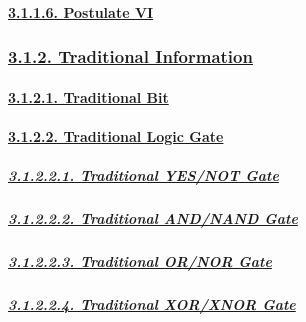 \documentclass[
]{article}
\begin{document}
\hypertarget{postulate-vi}{%
\paragraph{\texorpdfstring{\protect\hyperlink{postulate-vi-1}{3.1.1.6.
Postulate VI}}{3.1.1.6. Postulate VI}}\label{postulate-vi}}

\hypertarget{traditional-information}{%
\subsubsection{\texorpdfstring{\protect\hyperlink{traditional-information-1}{3.1.2.
Traditional
Information}}{3.1.2. Traditional Information}}\label{traditional-information}}

\hypertarget{traditional-bit}{%
\paragraph{\texorpdfstring{\protect\hyperlink{traditional-bit-1}{3.1.2.1.
Traditional Bit}}{3.1.2.1. Traditional Bit}}\label{traditional-bit}}

\hypertarget{traditional-logic-gate}{%
\paragraph{\texorpdfstring{\protect\hyperlink{traditional-logic-gate-1}{3.1.2.2.
Traditional Logic
Gate}}{3.1.2.2. Traditional Logic Gate}}\label{traditional-logic-gate}}

\hypertarget{traditional-yesnot-gate}{%
\subparagraph{\texorpdfstring{\protect\hyperlink{traditional-yesnot-gate-1}{3.1.2.2.1.
Traditional YES/NOT
Gate}}{3.1.2.2.1. Traditional YES/NOT Gate}}\label{traditional-yesnot-gate}}

\hypertarget{traditional-andnand-gate}{%
\subparagraph{\texorpdfstring{\protect\hyperlink{traditional-andnand-gate-1}{3.1.2.2.2.
Traditional AND/NAND
Gate}}{3.1.2.2.2. Traditional AND/NAND Gate}}\label{traditional-andnand-gate}}

\hypertarget{traditional-ornor-gate}{%
\subparagraph{\texorpdfstring{\protect\hyperlink{traditional-ornor-gate-1}{3.1.2.2.3.
Traditional OR/NOR
Gate}}{3.1.2.2.3. Traditional OR/NOR Gate}}\label{traditional-ornor-gate}}

\hypertarget{traditional-xorxnor-gate}{%
\subparagraph{\texorpdfstring{\protect\hyperlink{traditional-xorxnor-gate-1}{3.1.2.2.4.
Traditional XOR/XNOR
Gate}}{3.1.2.2.4. Traditional XOR/XNOR Gate}}\label{traditional-xorxnor-gate}}
\end{document}
